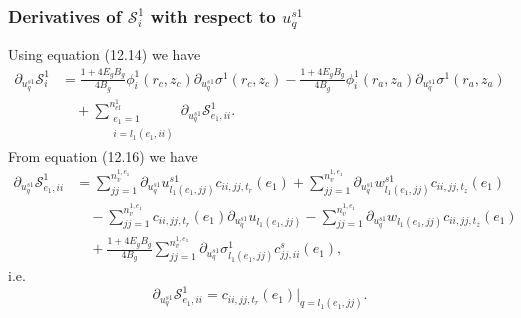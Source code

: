 \documentclass{article}
\begin{document}
\subsubsection{Derivatives of $\mathcal{S}_i^1$ with respect to $u_q^{s1}$} %
Using equation (12.14) we have
\begin{align}
\partial_{u_q^{s1}} \mathcal{S}_i^1 &= \frac{1 + 4 E_g B_g}{4 B_g} \phi_i^1(r_c,z_c) \partial_{u_q^{s1}} \sigma^1(r_c,z_c) - \frac{1 + 4 E_g B_g}{4 B_g} \phi_i^1(r_a,z_a) \partial_{u_q^{s1}} \sigma^1(r_a,z_a) \nonumber\\
&\quad + \sum_{\substack{e_1=1\\ i=l_1(e_1,ii)}}^{n_{el}^1} \partial_{u_q^{s1}} \mathcal{S}_{e_1,ii}^1. \tag{12.25}
\end{align}
From equation (12.16) we have
\begin{align}
\partial_{u_q^{s1}} \mathcal{S}_{e_1,ii}^1 &= \sum_{jj=1}^{n_v^{1,e_1}} \partial_{u_q^{s1}} u_{l_1(e_1,jj)}^{s1} c_{ii,jj,t_r}(e_1) + \sum_{jj=1}^{n_v^{1,e_1}} \partial_{u_q^{s1}} w_{l_1(e_1,jj)}^{s1} c_{ii,jj,t_z}(e_1) \nonumber\\
&\quad - \sum_{jj=1}^{n_v^{1,e_1}} c_{ii,jj,t_r}(e_1) \partial_{u_q^{s1}} u_{l_1(e_1,jj)} - \sum_{jj=1}^{n_v^{1,e_1}} \partial_{u_q^{s1}} w_{l_1(e_1,jj)} c_{ii,jj,t_z}(e_1) \nonumber\\
&\quad + \frac{1 + 4 E_g B_g}{4 B_g} \sum_{jj=1}^{n_v^{1,e_1}} \partial_{u_q^{s1}} \sigma_{l_1(e_1,jj)}^1 c_{jj,ii}^s(e_1), \tag{12.26}
\end{align}
i.e.
\begin{equation}
\partial_{u_q^{s1}} \mathcal{S}_{e_1,ii}^1 = c_{ii,jj,t_r}(e_1) \big|_{q=l_1(e_1,jj)}. \tag{12.27}
\end{equation}
\end{document}
